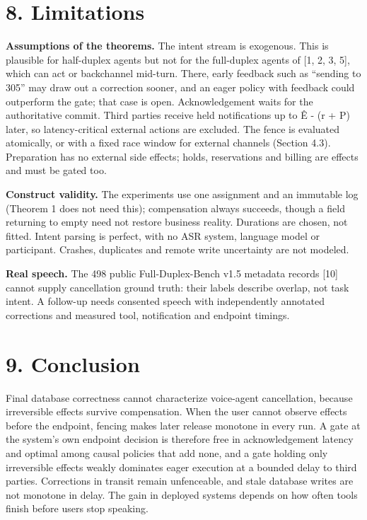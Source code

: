 \documentclass[review,12pt]{elsarticle}
\begin{document}
\section*{8. Limitations}

\textbf{Assumptions of the theorems.} The intent stream is exogenous. This is plausible for half-duplex agents but not for the full-duplex agents of [1, 2, 3, 5], which can act or backchannel mid-turn. There, early feedback such as ``sending to 305'' may draw out a correction sooner, and an eager policy with feedback could outperform the gate; that case is open. Acknowledgement waits for the authoritative commit. Third parties receive held notifications up to Ê - (r + P) later, so latency-critical external actions are excluded. The fence is evaluated atomically, or with a fixed race window for external channels (Section 4.3). Preparation has no external side effects; holds, reservations and billing are effects and must be gated too.


\textbf{Construct validity.} The experiments use one assignment and an immutable log (Theorem 1 does not need this); compensation always succeeds, though a field returning to empty need not restore business reality. Durations are chosen, not fitted. Intent parsing is perfect, with no ASR system, language model or participant. Crashes, duplicates and remote write uncertainty are not modeled.


\textbf{Real speech.} The 498 public Full-Duplex-Bench v1.5 metadata records [10] cannot supply cancellation ground truth: their labels describe overlap, not task intent. A follow-up needs consented speech with independently annotated corrections and measured tool, notification and endpoint timings.


\section*{9. Conclusion}

Final database correctness cannot characterize voice-agent cancellation, because irreversible effects survive compensation. When the user cannot observe effects before the endpoint, fencing makes later release monotone in every run. A gate at the system's own endpoint decision is therefore free in acknowledgement latency and optimal among causal policies that add none, and a gate holding only irreversible effects weakly dominates eager execution at a bounded delay to third parties. Corrections in transit remain unfenceable, and stale database writes are not monotone in delay. The gain in deployed systems depends on how often tools finish before users stop speaking.
\end{document}
